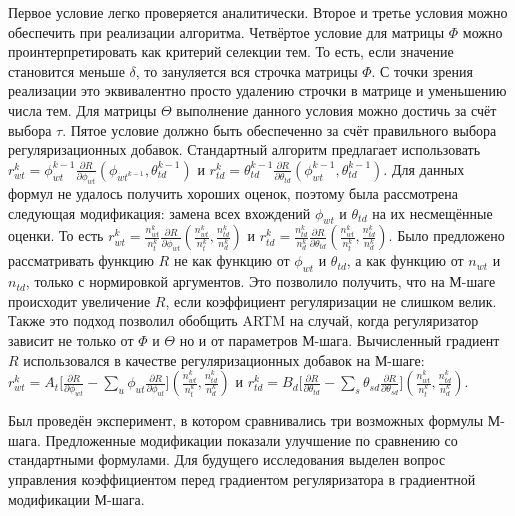 \documentclass[12pt, twoside]{article}
\begin{document}
Первое условие легко проверяется аналитически. Второе и третье условия можно обеспечить при реализации алгоритма. Четвёртое условие для матрицы $\Phi$ можно проинтерпретировать как критерий селекции тем. То есть, если значение становится меньше $\delta$, то зануляется вся строчка матрицы $\Phi$. С точки зрения реализации это эквивалентно просто удалению строчки в матрице и уменьшению числа тем. Для матрицы $\Theta$ выполнение данного условия можно достичь за счёт выбора $\tau$. Пятое условие должно быть обеспеченно за счёт правильного выбора регуляризационных добавок. Стандартный алгоритм предлагает использовать $r_{wt}^{k} = \phi_{wt}^{k-1} \frac{\partial{R}}{\partial{\phi_{wt}}}(\phi_{wt^{k-1}}, \theta_{td}^{k-1})$ и $r_{td}^{k}=  \theta_{td}^{k-1} \frac{\partial{R}}{\partial{\theta_{td}}}(\phi_{wt}^{k-1}, \theta_{td}^{k-1})$. Для данных формул не удалось получить хороших оценок, поэтому была рассмотрена следующая модификация: замена всех вхождений $\phi_{wt}$ и $\theta_{td}$ на их несмещённые оценки. То есть  $r_{wt}^k=  \frac{n^k_{wt}}{n^k_t}\frac{\partial{R}}{\partial{\phi_{wt}}}\left(\frac{n^k_{wt}}{n^k_t}, \frac{n^k_{td}}{n^k_d}\right)$ и $r_{td}^k=  \frac{n^k_{td}}{n^k_d}\frac{\partial{R}}{\partial{\theta_{td}}}\left(\frac{n^k_{wt}}{n^k_t}, \frac{n^k_{td}}{n^k_d}\right)$. Было предложено рассматривать функцию $R$ не как функцию от $\phi_{wt}$ и $\theta_{td}$, а как функцию от $n_{wt}$ и $n_{td}$, только с нормировкой аргументов. Это позволило получить, что на М-шаге происходит увеличение $R$, если коэффициент регуляризации не слишком велик. Также это подход позволил обобщить ARTM на случай, когда регуляризатор зависит не только от $\Phi$  и $\Theta$ но и от параметров М-шага. Вычисленный градиент $R$ использовался  в качестве регуляризационных добавок на М-шаге: $r^k_{wt} =  A_t \bigl[{\frac{\partial{R}}{\partial{\phi_{wt}}} - \sum\limits_u \phi_{ut} \frac{\partial{R}}{\partial{\phi_{ut}}} }\bigr] \left(\frac{n^k_{wt}}{n^k_t}, \frac{n^k_{td}}{n^k_d}\right)$ и $r^k_{td} =  B_d \bigl[ {\frac{\partial{R}}{\partial{\theta_{td}}} - \sum\limits_s \theta_{sd} \frac{\partial{R}}{\partial{\theta_{sd}}} }\bigr] \left(\frac{n^k_{wt}}{n^k_t}, \frac{n^k_{td}}{n^k_d}\right)$.

Был проведён эксперимент, в котором сравнивались три возможных формулы М-шага. Предложенные модификации показали улучшение по сравнению со стандартными формулами. Для будущего исследования выделен вопрос управления коэффициентом перед градиентом регуляризатора в градиентной модификации М-шага.





\maketitleSecondary
\English
\end{document}
